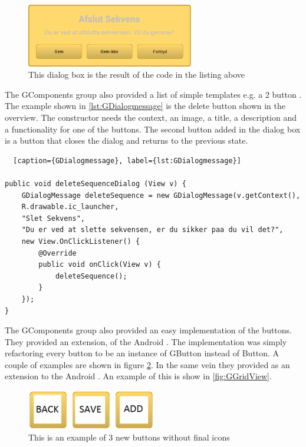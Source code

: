 \begin{figure} [h!]
\centering
\includegraphics[width=0.65\textwidth]{Pics/Sprint2/dialogs/afslutSekvens.png}
\caption{This dialog box is the result of the code in the listing above}
\label{fig:GDialog}
\end{figure}

The GComponents group also provided a list of simple templates e.g. a 2 button . The example shown in \ref{lst:GDialogmessage} is the delete button shown in the overview. The constructor needs the context, an image, a title, a description and a functionality for one of the buttons. The second button added in the dialog box is a button that closes the dialog and returns to the previous state.

\begin{lstlisting}  [caption={GDialogmessage}, label={lst:GDialogmessage}]

public void deleteSequenceDialog (View v) {
    GDialogMessage deleteSequence = new GDialogMessage(v.getContext(),
    R.drawable.ic_launcher,
    "Slet Sekvens",
    "Du er ved at slette sekvensen, er du sikker paa du vil det?",
    new View.OnClickListener() {
        @Override
        public void onClick(View v) {
            deleteSequence();
        }
    });
}

\end{lstlisting}

The GComponents group also provided an easy implementation of the buttons. They provided an extension,  of the Android . The implementation was simply refactoring every button to be an instance of GButton instead of Button. A couple of examples are shown in figure \ref{fig:buttons}. In the same vein they provided  as an extension to the Android . An example of this is show in \ref{fig:GGridView}.

\begin{figure} [h!]
\centering
\includegraphics[width=0.5\textwidth]{Pics/Sprint2/dialogs/backSaveAdd.png}
\caption{This is an example of 3 new buttons without final icons}
\label{fig:buttons}
\end{figure}

